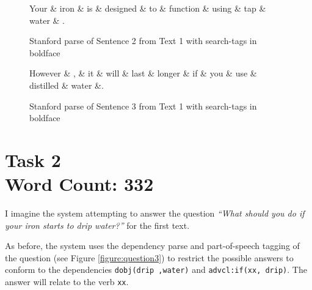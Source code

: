 \documentclass[12pt]{article}
\begin{document}
\begin{figure}[H]
\begin{dependency}
   \begin{deptext}[column sep=0.9cm]
      Your \& iron \& is \& designed \& to \& function \& using \& tap \& water \& . \\
   \end{deptext}
\end{dependency}
\caption{Stanford parse of Sentence 2 from Text 1 with search-tags in boldface}
\label{figure:sentence2}
\end{figure}

\begin{figure}[H]
\begin{dependency}
   \begin{deptext}[column sep=0.7cm]
      However \& , \& it \& will \& last \& longer \& if \& you \& use \& distilled \& water \&. \\
   \end{deptext}
\end{dependency}
\caption{Stanford parse of Sentence 3 from Text 1 with search-tags in boldface}
\label{figure:sentence3}
\end{figure}

\vspace{0.5in}

\section*{Task 2 \\ \small Word Count: 332}

I imagine the system attempting to answer the question \emph{``What should you do if your iron starts to drip water?''} for the first text. 

As before, the system uses the dependency parse and part-of-speech tagging of the question (see Figure \ref{figure:question3}) to restrict the possible answers to conform to the dependencies \texttt{dobj(drip ,water)} and \texttt{advcl:if(xx, drip)}. The answer will relate to the verb \texttt{xx}.
\end{document}
